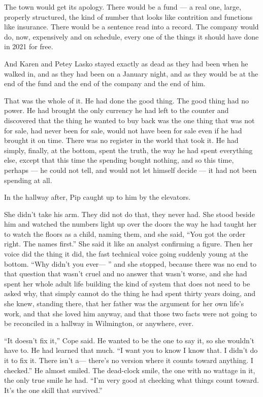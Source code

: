 \documentclass[11pt,openany]{book}
\newcommand{\scenebreak}{\par\vspace{0.5\baselineskip}\begin{center}\textasteriskcentered\quad\textasteriskcentered\quad\textasteriskcentered\end{center}\vspace{0.5\baselineskip}\par}
\begin{document}
The town would get its apology. There would be a fund --- a real one, large, properly structured, the kind of number that looks like contrition and functions like insurance. There would be a sentence read into a record. The company would do, now, expensively and on schedule, every one of the things it should have done in 2021 for free.

And Karen and Petey Lasko stayed exactly as dead as they had been when he walked in, and as they had been on a January night, and as they would be at the end of the fund and the end of the company and the end of him.

That was the whole of it. He had done the good thing. The good thing had no power. He had brought the only currency he had left to the counter and discovered that the thing he wanted to buy back was the one thing that was not for sale, had never been for sale, would not have been for sale even if he had brought it on time. There was no register in the world that took it. He had simply, finally, at the bottom, spent the truth, the way he had spent everything else, except that this time the spending bought nothing, and so this time, perhaps --- he could not tell, and would not let himself decide --- it had not been spending at all.


\scenebreak


In the hallway after, Pip caught up to him by the elevators.

She didn't take his arm. They did not do that, they never had. She stood beside him and watched the numbers light up over the doors the way he had taught her to watch the floors as a child, naming them, and she said, ``You got the order right. The names first.'' She said it like an analyst confirming a figure. Then her voice did the thing it did, the fast technical voice going suddenly young at the bottom. ``Why didn't you ever--- '' and she stopped, because there was no end to that question that wasn't cruel and no answer that wasn't worse, and she had spent her whole adult life building the kind of system that does not need to be asked why, that simply cannot do the thing he had spent thirty years doing, and she knew, standing there, that her father was the argument for her own life's work, and that she loved him anyway, and that those two facts were not going to be reconciled in a hallway in Wilmington, or anywhere, ever.

``It doesn't fix it,'' Cope said. He wanted to be the one to say it, so she wouldn't have to. He had learned that much. ``I want you to know I know that. I didn't do it to fix it. There isn't a--- there's no version where it counts toward anything. I checked.'' He almost smiled. The dead-clock smile, the one with no wattage in it, the only true smile he had. ``I'm very good at checking what things count toward. It's the one skill that survived.''
\end{document}
